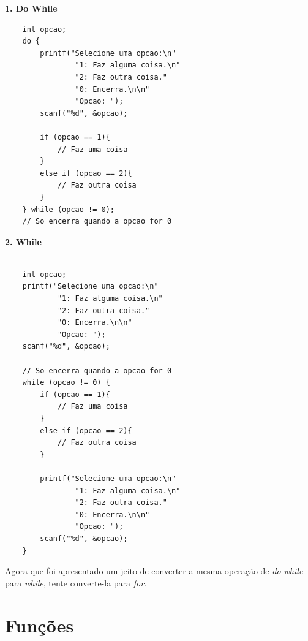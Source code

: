 \documentclass[12pt]{article}
\newcommand\tab[1][1cm]{\hspace*{#1}}
\begin{document}
\hspace{0.25cm}

\par\tab\textbf{1. Do While}

\hspace{0.25cm}
\begin{lstlisting}
    int opcao;
    do {
        printf("Selecione uma opcao:\n"
                "1: Faz alguma coisa.\n"
                "2: Faz outra coisa."
                "0: Encerra.\n\n"
                "Opcao: ");
        scanf("%d", &opcao);
        
        if (opcao == 1){
            // Faz uma coisa
        }
        else if (opcao == 2){
            // Faz outra coisa
        }
    } while (opcao != 0);
    // So encerra quando a opcao for 0
\end{lstlisting}

\par\tab\textbf{2. While}

\hspace{0.25cm}
\begin{lstlisting}

    int opcao;
    printf("Selecione uma opcao:\n"
            "1: Faz alguma coisa.\n"
            "2: Faz outra coisa."
            "0: Encerra.\n\n"
            "Opcao: ");
    scanf("%d", &opcao);
    
    // So encerra quando a opcao for 0
    while (opcao != 0) {
        if (opcao == 1){
            // Faz uma coisa
        }
        else if (opcao == 2){
            // Faz outra coisa
        }
    
        printf("Selecione uma opcao:\n"
                "1: Faz alguma coisa.\n"
                "2: Faz outra coisa."
                "0: Encerra.\n\n"
                "Opcao: ");
        scanf("%d", &opcao);
    }
\end{lstlisting}

\hspace{0.25cm}
\begin{tcolorbox}[colback=blue!5!white,colframe=blue!75!black,title=Dica!]
  \par\tab Agora que foi apresentado um jeito de converter a mesma operação de \textit{do while} para \textit{while}, tente converte-la para \textit{for}.
\end{tcolorbox}

\newpage

\section{Funções}
\end{document}
